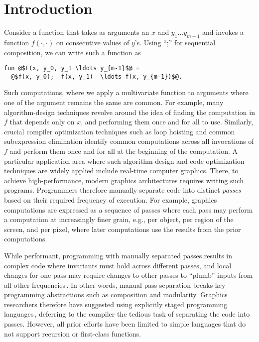 \section{Introduction}

Consider a function that takes as arguments an $x$ and $y_1 \ldots
y_{m-1}$ and invokes a function $f(\cdot, \cdot)$ on consecutive
values of $y$'s.  Using ``;'' for  sequential composition, we can
write such a function as
\begin{lstlisting}
fun @$F(x, y_0, y_1 \ldots y_{m-1}$@ = 
  @$f(x, y_0);  f(x, y_1)  \ldots f(x, y_{m-1})$@.
\end{lstlisting}
%

Such computations, where we apply a multivariate function to arguments
where one of the argument remains the same are common.  For example,
many algorithm-design techniques revolve around the idea of finding
the computation in $f$ that depends only on $x$, and performing them
once and for all to use.  Similarly, crucial compiler optimization
techniques such as loop hoisting and common subexpression elimination
identify common computations across all invocations of $f$ and perform
them once and for all at the beginning of the computation.  A
particular application area where such algorithm-design and code
optimization techniques are widely applied include real-time computer
graphics.  There, to achieve high-performance, modern graphics
architectures requires writing such programs.  Programmers therefore
manually separate code into distinct {\em passes} based on their
required frequency of execution.  For example, graphics computations
are expressed as a sequence of passes where each pass may perform a
computation at increasingly finer grain, e.g., per object, per region
of the screen, and per pixel, where later computations use the results
from the prior computations.

%
While performant, programming with manually separated passes results
in complex code where invariants must hold across different passes,
and local changes for one pass may require changes to other passes to
``plumb'' inputs from all other frequencies\,\cite{Foley:2011}.
%
In other words, manual pass separation breaks key programming
abstractions such as composition and modularity.
%
Graphics researchers therefore have suggested using explicitly staged
programming languages\,\cite{Proudfoot:2001,Foley:2011,He:2014},
deferring to the compiler the tedious task of separating the code into
passes. However, all prior efforts have been limited to simple
languages that do not support recursion or first-class functions.





